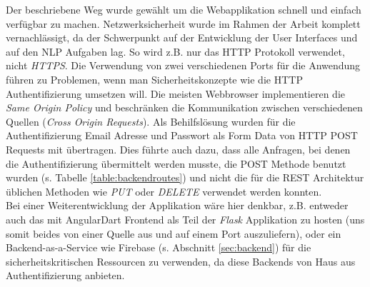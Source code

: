 Der beschriebene Weg wurde gewählt um die Webapplikation schnell und einfach verfügbar zu machen. Netzwerksicherheit wurde im Rahmen der Arbeit komplett vernachlässigt, da der Schwerpunkt auf der Entwicklung der User Interfaces und auf den NLP Aufgaben lag. So wird z.B. nur das HTTP Protokoll verwendet, nicht \textit{HTTPS}. Die Verwendung von zwei verschiedenen Ports für die Anwendung führen zu Problemen, wenn man Sicherheitskonzepte wie die HTTP Authentifizierung umsetzen will. Die meisten Webbrowser implementieren die \textit{Same Origin Policy} und beschränken die Kommunikation zwischen verschiedenen Quellen (\textit{Cross Origin Requests}). Als Behilfslösung wurden für die Authentifizierung Email Adresse und Passwort als Form Data von HTTP POST Requests mit übertragen. Dies führte auch dazu, dass alle Anfragen, bei denen die Authentifizierung übermittelt werden musste, die POST Methode benutzt wurden (s. Tabelle \ref{table:backendroutes}) und nicht die für die REST Architektur üblichen Methoden wie \textit{PUT} oder \textit{DELETE} verwendet werden konnten.\\
Bei einer Weiterentwicklung der Applikation wäre hier denkbar, z.B. entweder auch das mit AngularDart Frontend als Teil der \textit{Flask} Applikation zu hosten (uns somit beides von einer Quelle aus und auf einem Port auszuliefern), oder ein Backend-as-a-Service wie Firebase (s. Abschnitt \ref{sec:backend}) für die sicherheitskritischen Ressourcen zu verwenden, da diese Backends von Haus aus Authentifizierung anbieten.